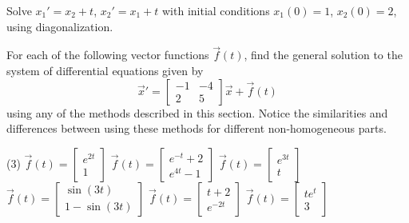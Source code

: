 \begin{exercise}\ansMark%
Solve
$x_1' = x_2 + t$, $x_2' = x_1 +t$ with initial conditions
$x_1(0) = 1$, $x_2(0) = 2$,
using diagonalization. %
\end{exercise}

\begin{exercise}
For each of the following vector functions $\vec{f}(t)$, find the general solution to the system of differential equations given by
\[ {\vec{x}}' = \begin{bmatrix} -1 & -4 \\ 2 & 5 \end{bmatrix} \vec{x} + \vec{f}(t)\] using any of the methods described in this section. Notice the similarities and differences between using these methods for different non-homogeneous parts.
\begin{tasks}(3)
\task $\vec{f}(t) = \begin{bmatrix} e^{2t} \\ 1 \end{bmatrix}$
\task $\vec{f}(t) = \begin{bmatrix} e^{-t} + 2 \\ e^{4t} - 1 \end{bmatrix}$
\task $\vec{f}(t) = \begin{bmatrix} e^{3t} \\ t \end{bmatrix}$
\task $\vec{f}(t) = \begin{bmatrix} \sin(3t) \\ 1 - \sin(3t) \end{bmatrix}$
\task $\vec{f}(t) = \begin{bmatrix} t + 2 \\ e^{-2t} \end{bmatrix}$
\task $\vec{f}(t) = \begin{bmatrix} te^{t} \\ 3 \end{bmatrix}$
\end{tasks} 
\end{exercise}
\comboSol{%
}
